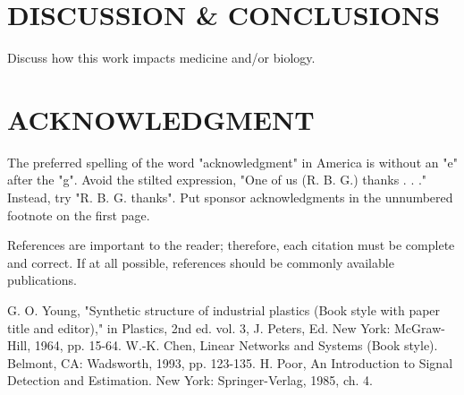 \documentclass[letterpaper, 10 pt, conference]{ieeeconf}  %
\begin{document}
\section{DISCUSSION \& CONCLUSIONS}

Discuss how this work impacts medicine and/or biology.

\addtolength{\textheight}{-12cm}   %








\section{ACKNOWLEDGMENT}

The preferred spelling of the word "acknowledgment" in America is without an "e" after the "g". Avoid the stilted expression, "One of us (R. B. G.) thanks . . ."  Instead, try "R. B. G. thanks". Put sponsor acknowledgments in the unnumbered footnote on the first page.




References are important to the reader; therefore, each citation must be complete and correct. If at all possible, references should be commonly available publications.



\begin{thebibliography}{99}

 G. O. Young, "Synthetic structure of industrial plastics (Book style with paper title and editor)," in Plastics, 2nd ed. vol. 3, J. Peters, Ed.  New York: McGraw-Hill, 1964, pp. 15-64.
 W.-K. Chen, Linear Networks and Systems (Book style).	Belmont, CA: Wadsworth, 1993, pp. 123-135.
 H. Poor, An Introduction to Signal Detection and Estimation.   New York: Springer-Verlag, 1985, ch. 4.


\end{thebibliography}
\end{document}
